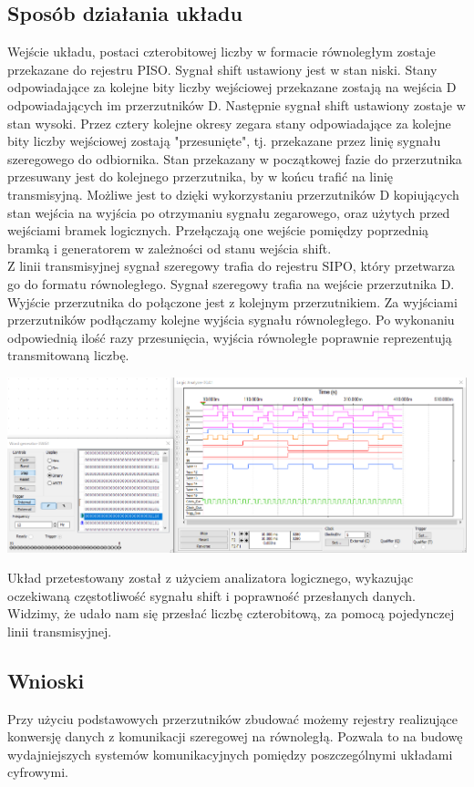 \documentclass{article}
\begin{document}
        \subsection{Sposób działania układu}
            Wejście układu, postaci czterobitowej liczby w formacie równoległym zostaje przekazane do rejestru PISO. Sygnał shift ustawiony jest w stan niski. Stany odpowiadające za kolejne bity liczby wejściowej przekazane zostają na wejścia D odpowiadających im przerzutników D. Następnie sygnał shift ustawiony zostaje w stan wysoki. Przez cztery kolejne okresy zegara stany odpowiadające za kolejne bity liczby wejściowej zostają "przesunięte", tj. przekazane przez linię sygnału szeregowego do odbiornika. Stan przekazany w początkowej fazie do przerzutnika przesuwany jest do kolejnego przerzutnika, by w końcu trafić na linię transmisyjną.  Możliwe jest to dzięki wykorzystaniu przerzutników D kopiujących stan wejścia na wyjścia po otrzymaniu sygnału zegarowego, oraz użytych przed wejściami bramek logicznych. Przełączają one wejście pomiędzy poprzednią bramką i generatorem w zależności od stanu wejścia shift. \\
            
            Z linii transmisyjnej sygnał szeregowy trafia do rejestru SIPO, który przetwarza go do formatu równoległego. Sygnał szeregowy trafia na wejście przerzutnika D. Wyjście przerzutnika do połączone jest z kolejnym przerzutnikiem. Za wyjściami przerzutników podłączamy kolejne wyjścia sygnału równoległego. Po wykonaniu odpowiednią ilość razy przesunięcia, wyjścia równoległe poprawnie reprezentują transmitowaną liczbę. \\
            
            \begin{center}
                \includegraphics[width=18cm]{reports/img/Z2C_2.png}\\
            \end{center}
            Układ przetestowany został z użyciem analizatora logicznego, wykazując oczekiwaną częstotliwość sygnału shift i poprawność przesłanych danych. Widzimy, że udało nam się przesłać liczbę czterobitową, za pomocą pojedynczej linii transmisyjnej. 
            
        \subsection{Wnioski}
            Przy użyciu podstawowych przerzutników zbudować możemy rejestry realizujące konwersję danych z komunikacji szeregowej na równoległą. Pozwala to na budowę wydajniejszych systemów komunikacyjnych pomiędzy poszczególnymi układami cyfrowymi. 
\end{document}
